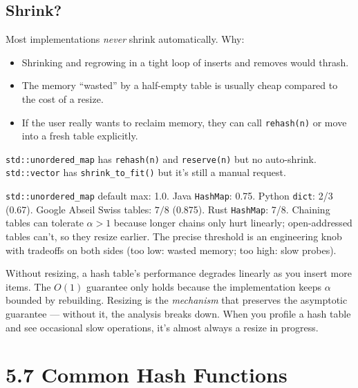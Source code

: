 \documentclass[11pt]{article}
\begin{document}
\subsection*{Shrink?}

Most implementations \emph{never} shrink automatically. Why:

\begin{itemize}[leftmargin=*]
    \item Shrinking and regrowing in a tight loop of inserts and
          removes would thrash.
    \item The memory ``wasted'' by a half-empty table is usually
          cheap compared to the cost of a resize.
    \item If the user really wants to reclaim memory, they can
          call \texttt{rehash(n)} or move into a fresh table
          explicitly.
\end{itemize}

\texttt{std::unordered\_map} has \texttt{rehash(n)} and
\texttt{reserve(n)} but no auto-shrink. \texttt{std::vector} has
\texttt{shrink\_to\_fit()} but it's still a manual request.

\begin{notebox}
\texttt{std::unordered\_map} default max: 1.0. Java
\texttt{HashMap}: 0.75. Python \texttt{dict}: 2/3 (0.67). Google
Abseil Swiss tables: $7/8$ (0.875). Rust \texttt{HashMap}: 7/8.
Chaining tables can tolerate $\alpha > 1$ because longer chains
only hurt linearly; open-addressed tables can't, so they resize
earlier. The precise threshold is an engineering knob with
tradeoffs on both sides (too low: wasted memory; too high: slow
probes).
\end{notebox}

\begin{ideabox}
Without resizing, a hash table's performance degrades linearly as
you insert more items. The $O(1)$ guarantee only holds because
the implementation keeps $\alpha$ bounded by rebuilding.
Resizing is the \emph{mechanism} that preserves the asymptotic
guarantee --- without it, the analysis breaks down. When you
profile a hash table and see occasional slow operations, it's
almost always a resize in progress.
\end{ideabox}

\section{5.7 Common Hash Functions}
\end{document}
